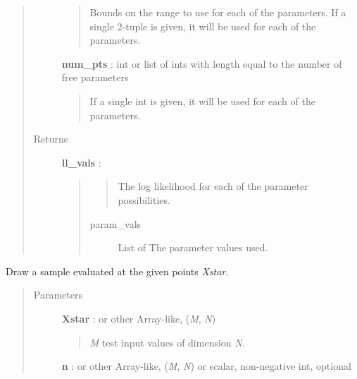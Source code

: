 \documentclass[letterpaper,10pt,english]{sphinxmanual}
\begin{document}
\begin{fulllineitems}
\begin{fulllineitems}
\begin{quote}
\begin{description}
\begin{quote}
Bounds on the range to use for each of the parameters. If a single
2-tuple is given, it will be used for each of the parameters.
\end{quote}

\textbf{num\_pts} : int or list of ints with length equal to the number of free parameters
\begin{quote}

If a single int is given, it will be used for each of the parameters.
\end{quote}

\item[{Returns }] \leavevmode
\textbf{ll\_vals} : 
\begin{quote}
\begin{quote}

The log likelihood for each of the parameter possibilities.
\end{quote}
\begin{description}
\item[{param\_vals}] \leavevmode{[}List of \code{Array}{]}
The parameter values used.

\end{description}
\end{quote}

\end{description}\end{quote}

\end{fulllineitems}


\begin{fulllineitems}
\label{gptools:gptools.gaussian_process.GaussianProcess.draw_sample}
Draw a sample evaluated at the given points \emph{Xstar}.
\begin{quote}\begin{description}
\item[{Parameters }] \leavevmode
\textbf{Xstar} :  or other Array-like, (\emph{M}, \emph{N})
\begin{quote}

\emph{M} test input values of dimension \emph{N}.
\end{quote}

\textbf{n} :  or other Array-like, (\emph{M}, \emph{N}) or scalar, non-negative int, optional
\begin{quote}


\end{quote}
\end{description}
\end{quote}
\end{fulllineitems}
\end{fulllineitems}
\end{document}
